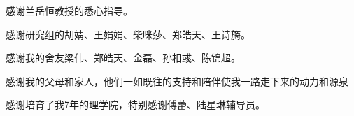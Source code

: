 
\begin{acknowledgement}
  感谢兰岳恒教授的悉心指导。

  感谢研究组的胡婧、王娟娟、柴咪莎、郑皓天、王诗旖。

  感谢我的舍友梁伟、郑皓天、金磊、孙相彧、陈锦超。

  感谢我的父母和家人，他们一如既往的支持和陪伴使我一路走下来的动力和源泉

  感谢培育了我7年的理学院，特别感谢傅蕾、陆星琳辅导员。
\end{acknowledgement}
